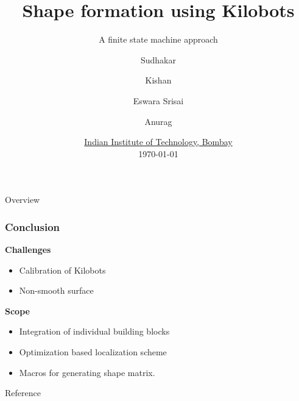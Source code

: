 \documentclass{beamer}
\title[Seminar presentation] %
{Shape formation using Kilobots}
\subtitle{A finite state machine approach}
\author[shortname]{Sudhakar\inst{1} \and Kishan\inst{1} \and Eswara Srisai\inst{1} \and Anurag\inst{1}}
\institute[VFU] %
{
  \inst{1}%
  M.Tech scholar\\
  Systems and Control Engineering
}
\date[VLC 2013] %
{\href{http://www.iitb.ac.in/}{Indian Institute of Technology, Bombay}\\\today}
\begin{document}
\setlength\abovecaptionskip{-2pt}	
\setlength{\abovedisplayskip}{0pt}
\setlength{\belowdisplayskip}{0pt}
\setlength{\abovedisplayshortskip}{0pt}
\setlength{\belowdisplayshortskip}{0pt}

\frame{\titlepage}
\begin{frame}{Overview}
\tableofcontents
\end{frame}





\begin{frame}
\frametitle{Conclusion}
\textbf{Challenges}
\begin{itemize}
	\item Calibration of Kilobots
	\item Non-smooth surface
\end{itemize}
\vspace{0.5cm}
\textbf{Scope}
\begin{itemize}
	\item Integration of individual building blocks
	\item Optimization based localization scheme \cite{MR-AC-RN:2014}\\
	\item Macros for generating shape matrix.
\end{itemize}
\end{frame}

\begin{frame}[allowframebreaks]{Reference}
\AtNextBibliography{\small}
\printbibliography
\end{frame}
\end{document}
